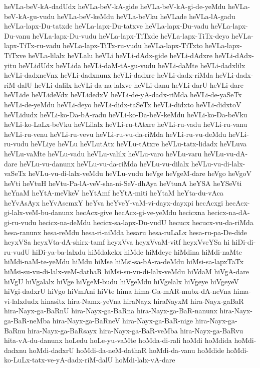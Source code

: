 {heVLa-beV-kA-dadUdx
heVLa-beV-kA-gide
heVLa-beV-kA-gi-de-yeMdu
heVLa-beV-kA-gu-vudu
heVLa-beV-keMdu
heVLa-beVku
heVLade
heVLa-lA-gadu
heVLa-lapx-Du-tatxde
heVLa-lapx-Du-tatxve
heVLa-lapx-Du-vadu
heVLa-lapx-Du-vanu
heVLa-lapx-Du-vudu
heVLa-lapx-TiTxde
heVLa-lapx-TiTx-deyo
heVLa-lapx-TiTx-ru-vadu
heVLa-lapx-TiTx-ru-vudu
heVLa-lapx-TiTxto
heVLa-lapx-TiTxve
heVLa-lilalx
heVLalu
heVLi
heVLi-dAdx-gide
heVLi-dAdxre
heVLi-dAdx-yitu
heVLidUdx
heVLida
heVLi-daM-tA-gu-vudu
heVLi-daMte
heVLi-dadxlilx
heVLi-dadxneVnx
heVLi-dadxnunx
heVLi-dadxre
heVLi-dadx-riMda
heVLi-dadx-riM-dalU
heVLi-dalilx
heVLi-da-na-lalxve
heVLi-danu
heVLi-darU
heVLi-dare
heVLide
heVLideVdx
heVLidedxV
heVLi-de-yA-dadx-riMda
heVLi-de-yaSeTx
heVLi-de-yeMdu
heVLi-deyo
heVLi-didx-taSeTx
heVLi-didxto
heVLi-didxtoV
heVLidudx
heVLi-ko-Da-bA-radu
heVLi-ko-Da-beV-keMdu
heVLi-ko-Da-beVku
heVLi-ko-LaLx-beVku
heVLilalx
heVLi-ru-tAtxre
heVLi-ru-vadu
heVLi-ru-vanu
heVLi-ru-venu
heVLi-ru-vevu
heVLi-ru-vu-da-riMda
heVLi-ru-vu-deMdu
heVLi-ru-vudu
heVLiye
heVLu
heVLutAtx
heVLu-tAtxre
heVLu-tatx-lidadx
heVLuva
heVLu-vaMte
heVLu-vadu
heVLu-valilx
heVLu-varo
heVLu-varu
heVLu-vu-dA-dare
heVLu-vu-danunx
heVLu-vu-da-riMda
heVLu-vu-dilalx
heVLu-vu-di-lalx-vaSeTx
heVLu-vu-di-lalx-veMdu
heVLu-vudu
heVge
heVgeM-dare
heVgo
heVgoV
heVti
heVtuH
heVtu-Pa-lA-veV-sha-ni-SeV-dhAya
heVtunA
heYSA
heYSeVti
heYnaM
heYtA-meVkeV
heYtAmf
heYtA-miti
heYtaM
heYta-du-vAca
heYvAsAyx
heYvAsemxY
heYva
heYveY-vaM-vi-dayx-dayxpi
hecAcxgi
hecAcx-gi-lalx-veM-bu-danunx
hecAcx-give
hecAcx-gi-ve-yeMdu
hecicxna
hecicx-na-dA-gi-ru-vudu
hecicx-na-deMdu
hecicx-sa-lapx-Du-vudU
hecucx
hecucx-vu-da-riMda
hesa-ranunx
hesa-reMdu
hesa-ri-niMda
hesaru
hesa-ruLaLx
hesa-ru-pa-De-dide
heyxVSa
heyxVta-dA-shirx-tamf
heyxVva
heyxVvaM-vitf
heyxVveYSa
hi
hiDi-di-ru-vudU
hiDi-ya-ba-lalxdu
hiMdakekx
hiMde
hiMdeye
hiMdina
hiMdi-naMte
hiMdi-naM-te-yeMdu
hiMdu
hiMse
hiMsi-sa-bA-ra-deMdu
hiMsi-sa-lapxTaTx
hiMsi-su-vu-di-lalx-veM-dathaR
hiMsi-su-vu-di-lalx-veMdu
hiVdaM
hiVgA-dare
hiVgU
hiVgalalx
hiVge
hiVgeM-budu
hiVgeMdu
hiVgelalx
hiVgeye
hiVgeyeV
hiVgi-dadxrU
hiVgo
hiVmAni
hiVte
hima
hima-Ga-mAR-mubx-dA-neVna
hima-vi-lalxdudx
hinasitx
hira-Namx-yeVna
hiraNayx
hiraNayxM
hira-Nayx-gaBaR
hira-Nayx-ga-BaRnU
hira-Nayx-ga-BaRna
hira-Nayx-ga-BaR-nanunx
hira-Nayx-ga-BaR-neMba
hira-Nayx-ga-BaRneV
hira-Nayx-ga-BaR-nige
hira-Nayx-ga-BaRnu
hira-Nayx-ga-BaRsayx
hira-Nayx-ga-BaR-veMba
hira-Nayx-ga-BaRvu
hita-vA-du-danunx
hoLedu
hoLe-yu-vaMte
hoMda-di-rali
hoMdi
hoMdida
hoMdi-dadxnu
hoMdi-dadxrU
hoMdi-da-neM-dathaR
hoMdi-da-vanu
hoMdide
hoMdi-ko-LuLx-tatx-ve-yA-dadx-riM-dalU
hoMdi-lalx-vA-dare
}
